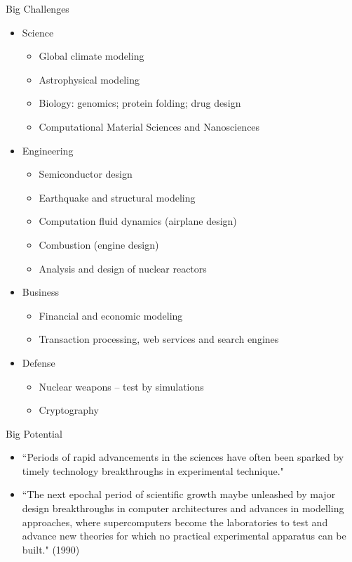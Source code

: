 \documentclass[xcolor=x11names,compress]{beamer}
\renewcommand{\(}{\begin{columns}}
\renewcommand{\)}{\end{columns}}
\newcommand{\<}[1]{\begin{column}{#1}}
\renewcommand{\>}{\end{column}}
\begin{document}
\begin{frame}{Big Challenges}
\begin{itemize}
\item Science
\begin{itemize}
\item Global climate modeling
\item Astrophysical modeling
\item Biology: genomics; protein folding; drug design
\item Computational Material Sciences and Nanosciences
\end{itemize}
\item Engineering
\begin{itemize}
\item Semiconductor design
\item Earthquake and structural modeling
\item Computation fluid dynamics (airplane design)
\item Combustion (engine design)
\item Analysis and design of nuclear reactors
\end{itemize}
\item Business
\begin{itemize}
\item Financial and economic modeling
\item Transaction processing, web services and search engines
\end{itemize}
\item Defense
\begin{itemize}
\item Nuclear weapons -- test by simulations
\item Cryptography
\end{itemize}
\end{itemize}
\end{frame}

\begin{frame}{Big Potential}
\begin{itemize}
\item ``Periods of rapid advancements in the sciences have often been sparked by timely technology breakthroughs in experimental technique." 
\item ``The next epochal period of scientific growth maybe unleashed by major design breakthroughs in computer architectures and advances in modelling approaches, where supercomputers become the laboratories to test and advance new theories for which no practical experimental apparatus can be built." (1990)
\end{itemize}
\end{frame}
\end{document}
